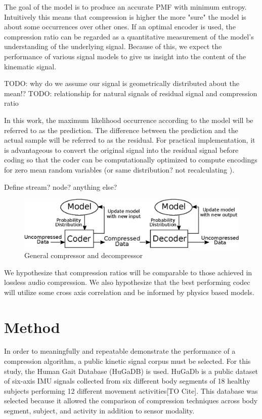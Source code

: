 \documentclass[journal]{IEEEtran}
\begin{document}
The goal of the model is to produce an accurate PMF with minimum entropy. Intuitively this means that compression is higher the more "sure" the model is about some occurrences over other ones. If an optimal encoder is used, the compression ratio can be regarded as a quantitative measurement of the model's understanding of the underlying signal. Because of this, we expect the performance of various signal models to give us insight into the content of the kinematic signal.

TODO: why do we assume our signal is geometrically distributed about the mean!?
TODO: relationship for natural signals of residual signal and compression ratio

In this work, the maximum likelihood occurrence according to the model will be referred to as the prediction. The difference between the prediction and the actual sample will be referred to as the residual. For practical implementation, it is advantageous to convert the original signal into the residual signal before coding so that the coder can be computationally optimized to compute encodings for zero mean random variables (or same distribution? not recalculating ).

Define stream? node? anything else?

\begin{figure}
  \includegraphics[width=\linewidth]{general_compressor.eps}
  \caption{General compressor and decompressor}
  \label{fig:general_compressor}
\end{figure}

We hypothesize that compression ratios will be comparable to those achieved in lossless audio compression. We also hypothesize that the best performing codec will utilize some cross axis correlation and be informed by physics based models.

\section{Method}
In order to meaningfully and repeatable demonstrate the performance of a compression algorithm, a public kinetic signal corpus must be selected. For this study, the Human Gait Database (HuGaDB) is used. HuGaDb is a public dataset of six-axis IMU signals collected from six different body segments of 18 healthy subjects performing 12 different movement activities[TO Cite]. This database was selected because it allowed the comparison of compression techniques across body segment, subject, and activity in addition to sensor modality.
\end{document}
